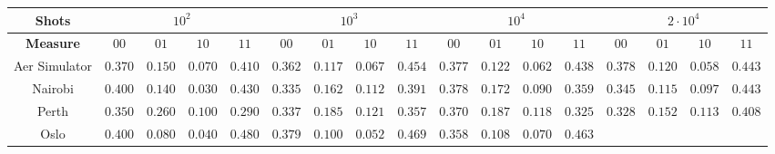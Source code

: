 \begin{landscape}
\vspace*{\fill}
\begin{tabular}{c|cccc|cccc|cccc|cccc}
\toprule
\textbf{Shots}  & \multicolumn{4}{c|}{$\scriptstyle10^2$} 
                & \multicolumn{4}{c|}{$\scriptstyle10^3$} 
                & \multicolumn{4}{c|}{$\scriptstyle10^4$} 
                & \multicolumn{4}{c}{$\scriptstyle2\cdot 10^4$}\\
\midrule
\textbf{Measure}    & $\scriptstyle00$ & $\scriptstyle01$ & $\scriptstyle10$ & $\scriptstyle11$
                    & $\scriptstyle00$ & $\scriptstyle01$ & $\scriptstyle10$ & $\scriptstyle11$
                    & $\scriptstyle00$ & $\scriptstyle01$ & $\scriptstyle10$ & $\scriptstyle11$
                    & $\scriptstyle00$ & $\scriptstyle01$ & $\scriptstyle10$ & $\scriptstyle11$\\
\midrule
Aer Simulator   & $\scriptstyle0.370$ & $\scriptstyle0.150$ & $\scriptstyle0.070$ & $\scriptstyle0.410$ 
                & $\scriptstyle0.362$ & $\scriptstyle0.117$ & $\scriptstyle0.067$ & $\scriptstyle0.454$ 
                & $\scriptstyle0.377$ & $\scriptstyle0.122$ & $\scriptstyle0.062$ & $\scriptstyle0.438$ 
                & $\scriptstyle0.378$ & $\scriptstyle0.120$ & $\scriptstyle0.058$ & $\scriptstyle0.443$\\                
Nairobi         & $\scriptstyle0.400$ & $\scriptstyle0.140$ & $\scriptstyle0.030$ & $\scriptstyle0.430$ 
                & $\scriptstyle0.335$ & $\scriptstyle0.162$ & $\scriptstyle0.112$ & $\scriptstyle0.391$ 
                & $\scriptstyle0.378$ & $\scriptstyle0.172$ & $\scriptstyle0.090$ & $\scriptstyle0.359$
                & $\scriptstyle0.345$ & $\scriptstyle0.115$ & $\scriptstyle0.097$ & $\scriptstyle0.443$\\               
Perth           & $\scriptstyle0.350$ & $\scriptstyle0.260$ & $\scriptstyle0.100$ & $\scriptstyle0.290$ 
                & $\scriptstyle0.337$ & $\scriptstyle0.185$ & $\scriptstyle0.121$ & $\scriptstyle0.357$ 
                & $\scriptstyle0.370$ & $\scriptstyle0.187$ & $\scriptstyle0.118$ & $\scriptstyle0.325$
                & $\scriptstyle0.328$ & $\scriptstyle0.152$ & $\scriptstyle0.113$ & $\scriptstyle0.408$\\
Oslo            & $\scriptstyle0.400$ & $\scriptstyle0.080$ & $\scriptstyle0.040$ & $\scriptstyle0.480$ 
                & $\scriptstyle0.379$ & $\scriptstyle0.100$ & $\scriptstyle0.052$ & $\scriptstyle0.469$ 
                & $\scriptstyle0.358$ & $\scriptstyle0.108$ & $\scriptstyle0.070$ & $\scriptstyle0.463$

\end{tabular}
\end{landscape}
